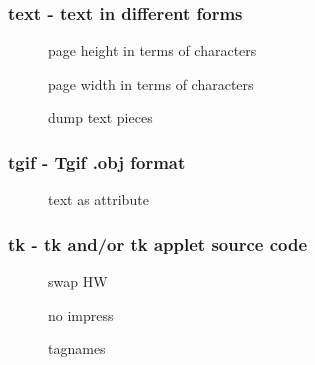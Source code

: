\documentclass[english,a4paper]{article}
\begin{document}
\subsubsection{text - text in different forms }
\begin{description}
\item[] 
page height in terms of characters


\item[] 
page width in terms of characters


\item[] 
dump text pieces


\end{description}
\subsubsection{tgif - Tgif .obj format}
\begin{description}
\item[] 
text as attribute


\end{description}
\subsubsection{tk - tk and/or tk applet source code}
\begin{description}
\item[] 
swap HW


\item[] 
no impress


\item[] 
tagnames


\end{description}
\end{document}
